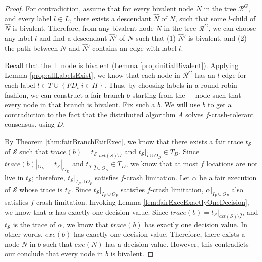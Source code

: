 \documentclass[11pt]{article}
\numberwithin{theorem}{section}
\newcommand{\set}[1]{\left\{#1\right\}}
\begin{document}
\begin{proof}
 For contradiction, assume that for every bivalent node $N$ in the tree $\mathcal{R}^{G}$, and every label $l \in L$, there exists a descendant $\hat{N}$ of $N$, such that some $l$-child of $\hat{N}$ is bivalent. 
Therefore, from any bivalent node $N$ in the tree $\mathcal{R}^{G}$, we can choose any label $l$ and find a descendant $\hat{N}'$ of $N$ such that (1) $\hat{N}'$ is bivalent, and (2) the path between $N$ and $\hat{N}'$ contains an edge with label $l$. 

Recall that the $\top$ node is bivalent (Lemma \ref{prop:initialBivalent}).  Applying Lemma \ref{prop:allLabelsExist}, we know that each node in $\mathcal{R}^G$ has an $l$-edge for each label $l \in T \cup \set{FD_i | i \in \Pi}$. Thus, by choosing labels in a round-robin fashion, we can construct a fair branch $b$ starting from the $\top$ node such that every node in that branch is bivalent. Fix such a $b$. We will use $b$ to get a contradiction to the fact that the distributed algorithm $A$ solves $f$-crash-tolerant consensus. using $D$.


By Theorem \ref{thm:fairBranchFairExec}, we know that there exists a fair trace $t_{\mathcal{S}}$ of $\mathcal{S}$ such that $trace(b) = t_{\mathcal{S}}|_{act(S) \setminus \hat{I}}$ and $t_{\mathcal{S}}|_{\hat{I} \cup O_D} \in T_D$. Since $trace(b)|_{O_D} = t_{\mathcal{S}}|_{O_D}$ and $t_{\mathcal{S}}|_{\hat{I} \cup O_D} \in T_D$, we know that at most $f$ locations are not live in $t_{\mathcal{S}}$; therefore, $t_{\mathcal{S}}|_{I_P \cup O_P}$ satisfies $f$-crash limitation. Let $\alpha$ be a fair execution of $\mathcal{S}$ whose trace is $t_{\mathcal{S}}$. Since $t_{\mathcal{S}}|_{I_P \cup O_P}$ satisfies $f$-crash limitation, $\alpha|_{I_P \cup O_P}$ also satisfies $f$-crash limitation. Invoking Lemma \ref{lem:fairExecExactlyOneDecision}, we know that $\alpha$ has exactly one decision value. Since $trace(b) = t_{\mathcal{S}}|_{act(S) \setminus \hat{I}}$, and $t_{\mathcal{S}}$ is the trace of $\alpha$, we know that $trace(b)$ has exactly one decision value. In other words, $exe(b)$ has exactly one decision value.  Therefore, there exists a node $N$ in $b$ such that $exe(N)$ has a decision value. However, this contradicts our conclude that every node in $b$ is bivalent.
\end{proof}
\end{document}
